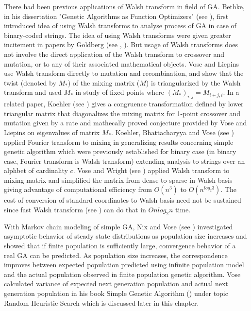 There had been previous applications of Walsh transform in field of GA. Bethke, in his dissertation 
"Genetic Algorithms as Function Optimizers" (see \cite{Bethke1981}), first introduced 
idea of using Walsh transforms to analyse process of GA in case of binary-coded strings. The idea of using Walsh transforms 
were given greater incitement in papers by Goldberg (see \cite{Goldberg1989a}, \cite{Goldberg1989b}). But usage of 
Walsh transforms does not involve the direct application of the Walsh transform to crossover and mutation, or to any of their 
associated mathematical objects. Vose and Liepins use Walsh transform directly to mutation and recombination, and show that the 
twist (denoted by $M_*$) of the mixing matrix ($M$) is triangularized by the Walsh transform and used $M_*$ in study of fixed points where $(M_*)_{i,j} = M_{i+j, i}$. In a related paper, Koehler (see \cite{Koehler1995}) gives a congruence 
transformation defined by lower triangular matrix that diagonalizes the mixing matrix for 1-point crossover and mutation given by a rate and mathecally proved conjecture provided by Vose and Liepins on eigenvalues of matrix $M_*$. Koehler, Bhattacharyya and Vose (see \cite{KoehlerBhatta1998}) applied Fourier transform to mixing in generalizing results concerning simple genetic algorithm which were previously established for binary case (in binary case, Fourier transform is Walsh transform) extending analysis to strings over an alphbet of cardinality $c$. Vose and Wright (see \cite{VoseWright1998}) applied Walsh transform to mixing matrix and simplified the matrix from dense to sparse in Walsh basis giving advantage of computational efficiency from $O(n^3)$ to $O(n^{log_2 3})$. The cost of conversion of standard coordinates to Walsh basis need not be sustained since fast Walsh transform (see \cite{Shanks1969}) can do that in $O{n log_2 n}$ time.


With Markov chain modeling of simple GA, Nix and Vose (see \cite{Nix1992}) investigated asymptotic behavior of steady 
state distributions as population size increases and showed that if finite population is sufficiently large, 
convergence behavior of a real GA can be predicted. As population size increases, the correspondence improves 
between expected population predicted using infinite population model and the actual population observed in 
finite population genetic algorithm.  Vose calculated variance of expected next generation population and 
actual next generation population in his book Simple Genetic Algorithm (\cite{Vose1999}) under topic 
Random Heuristic Search which is discussed later in this chapter. 

